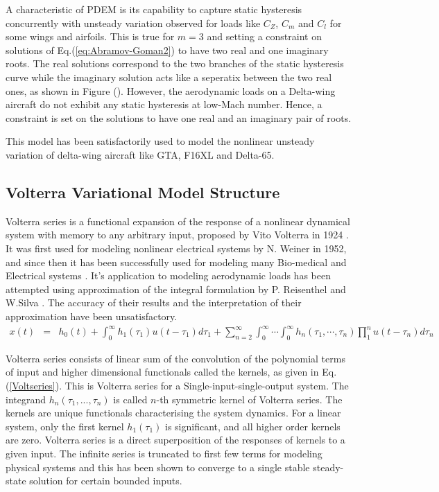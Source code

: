 \documentclass{AIAA}
\begin{document}
A characteristic of PDEM is its capability to capture static hysteresis concurrently with unsteady variation observed for loads like $C_Z$, $C_m$ and $C_l$ for some wings and airfoils. This is true for $m=3$ and setting a constraint on solutions of Eq.(\ref{eq:Abramov-Goman2}) to have two real and one imaginary roots. The real solutions correspond to the two branches of the static hysteresis curve while the imaginary solution acts like a seperatix between the two real ones, as shown in Figure (). However, the aerodynamic loads on a Delta-wing aircraft do not exhibit any static hysteresis at low-Mach number. Hence, a constraint is set on the solutions to have one real and an imaginary pair of roots.

This model has been satisfactorily used to model the nonlinear unsteady variation of delta-wing aircraft like GTA, F16XL and Delta-65. 

\subsection{Volterra Variational Model Structure}
Volterra series is a functional expansion of the response of a nonlinear dynamical system with memory to any arbitrary input, proposed by Vito Volterra in 1924 \cite{Volterra}. It was first used for modeling nonlinear electrical systems by N. Weiner in 1952, and since then it has been successfully used for modeling many Bio-medical and Electrical systems \cite{Marmerelis}. It's application to modeling aerodynamic loads has been attempted using approximation of the integral formulation by P. Reisenthel and W.Silva \cite{ReiKernel,SilvaUnst}. The accuracy of their results and the interpretation of their approximation have been unsatisfactory.
\begin{eqnarray}\label{Voltseries}
x(t)&=&h_0(t) + \int_{0}^{\infty} h_1(\tau_1)u(t-\tau_1)d\tau_1 + \sum_{n=2}^\infty \int_{0}^{\infty} \cdots \int_{0}^{\infty}{h_n(\tau_1,\cdots,\tau_n)\prod_1^n u(t-\tau_n)d\tau_n}
\end{eqnarray}

Volterra series consists of linear sum of the convolution of the polynomial terms of input and higher dimensional functionals called the kernels, as given in Eq.(\ref{Voltseries}). This is Volterra series for a Single-input-single-output system. The integrand $h_n(\tau_1,...,\tau_n)$ is called $n$-th symmetric kernel of Volterra series. The kernels are unique functionals characterising the system dynamics. For a linear system, only the first kernel $h_1(\tau_1)$ is significant, and all higher order kernels are zero. Volterra series is a direct superposition of the responses of kernels to a given input. The infinite series is truncated to first few terms for modeling physical systems and this has been shown to converge to a single stable steady-state solution for certain bounded inputs\cite{BoydChua}. 
\end{document}
